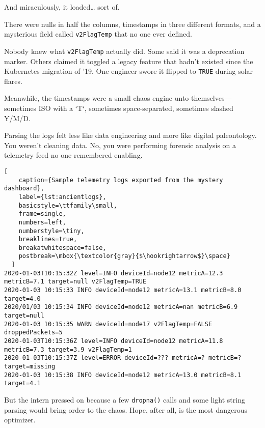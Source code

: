 And miraculously, it loaded… sort of.

There were nulls in half the columns, timestamps in three different formats, and a mysterious field called \texttt{v2FlagTemp} that no one ever defined.

Nobody knew what \texttt{v2FlagTemp} actually did. Some said it was a deprecation marker. Others claimed it toggled a legacy feature that hadn’t existed since the Kubernetes migration of ’19. One engineer swore it flipped to \texttt{TRUE} during solar flares.

Meanwhile, the timestamps were a small chaos engine unto themselves—sometimes ISO with a `T`, sometimes space-separated, sometimes slashed Y/M/D.

Parsing the logs felt less like data engineering and more like digital paleontology. You weren’t cleaning data. No, you were performing forensic analysis on a telemetry feed no one remembered enabling.

\begin{lstlisting}[
    caption={Sample telemetry logs exported from the mystery dashboard},
    label={lst:ancientlogs},
    basicstyle=\ttfamily\small,
    frame=single,
    numbers=left,
    numberstyle=\tiny,
    breaklines=true,
    breakatwhitespace=false,
    postbreak=\mbox{\textcolor{gray}{$\hookrightarrow$}\space}
  ]
2020-01-03T10:15:32Z level=INFO deviceId=node12 metricA=12.3 metricB=7.1 target=null v2FlagTemp=TRUE
2020-01-03 10:15:33 INFO deviceId=node12 metricA=13.1 metricB=8.0 target=4.0
2020/01/03 10:15:34 INFO deviceId=node12 metricA=nan metricB=6.9 target=null
2020-01-03 10:15:35 WARN deviceId=node17 v2FlagTemp=FALSE droppedPackets=5
2020-01-03T10:15:36Z level=INFO deviceId=node12 metricA=11.8 metricB=7.3 target=3.9 v2FlagTemp=1
2020-01-03T10:15:37Z level=ERROR deviceId=??? metricA=? metricB=? target=missing
2020-01-03 10:15:38 INFO deviceId=node12 metricA=13.0 metricB=8.1 target=4.1
\end{lstlisting}

But the intern pressed on because a few \texttt{dropna()} calls and some light string parsing would bring order to the chaos. Hope, after all, is the most dangerous optimizer.

